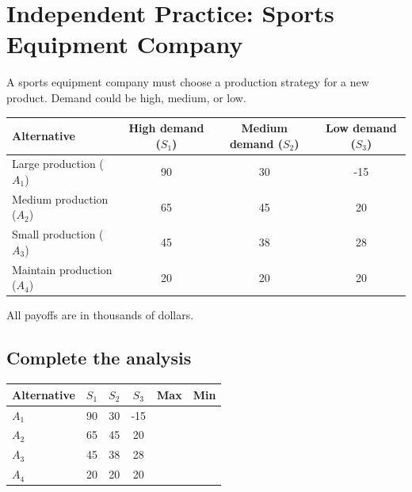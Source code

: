 	
	\section{Independent Practice: Sports Equipment Company}
	
	A sports equipment company must choose a production strategy for a new
	product. Demand could be high, medium, or low.
	
	\begin{center}
		\renewcommand{\arraystretch}{1.3}
		\begin{tabular}{lccc}
			\toprule
			Alternative & High demand ($S_1$) & Medium demand ($S_2$) & Low demand ($S_3$) \\
			\midrule
			Large production ($A_1$) & 90 & 30 & -15 \\
			Medium production ($A_2$) & 65 & 45 & 20 \\
			Small production ($A_3$) & 45 & 38 & 28 \\
			Maintain production ($A_4$) & 20 & 20 & 20 \\
			\bottomrule
		\end{tabular}
	\end{center}
	
	All payoffs are in thousands of dollars.
	
	\subsection*{Complete the analysis}
	
	\begin{center}
		\renewcommand{\arraystretch}{1.8}
		\begin{tabular}{lccccc}
			\toprule
			Alternative & $S_1$ & $S_2$ & $S_3$ & Max & Min \\
			\midrule
			$A_1$ & 90 & 30 & -15 & \underline{\hspace{1.6cm}} & \underline{\hspace{1.6cm}}\\[3pt]
			$A_2$ & 65 & 45 & 20 & \underline{\hspace{1.6cm}} & \underline{\hspace{1.6cm}}\\[3pt]
			$A_3$ & 45 & 38 & 28 & \underline{\hspace{1.6cm}} & \underline{\hspace{1.6cm}}\\[3pt]
			$A_4$ & 20 & 20 & 20 & \underline{\hspace{1.6cm}} & \underline{\hspace{1.6cm}}\\
			\bottomrule
		\end{tabular}
	\end{center}
	
